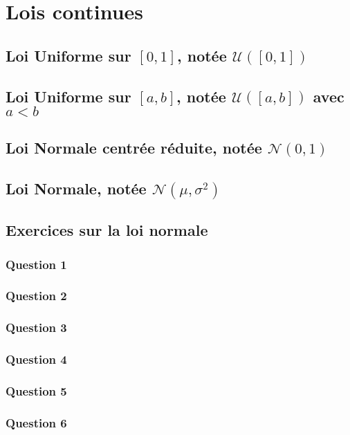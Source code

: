 \section{Lois continues}
    \subsection{Loi Uniforme sur $[0,1]$, notée $\mathcal{U}([0,1])$}
    


    \subsection{Loi Uniforme sur $[a,b]$, notée $\mathcal{U}([a,b])$ avec $a < b$}



    \subsection{Loi Normale centrée réduite, notée $\mathcal{N}(0,1)$}



    \subsection{Loi Normale, notée $\mathcal{N}(\mu,\sigma^2)$}

    \subsection{Exercices sur la loi normale}
        \subsubsection{Question 1}
        \subsubsection{Question 2}
        \subsubsection{Question 3}
        \subsubsection{Question 4}
        \subsubsection{Question 5}
        \subsubsection{Question 6}
